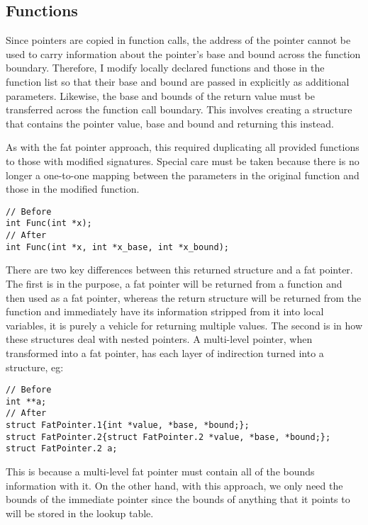 \subsection{Functions}

Since pointers are copied in function calls, the address of the pointer cannot be used to carry information about the pointer's base and bound across the function boundary.
Therefore, I modify locally declared functions and those in the function list so that their base and bound are passed in explicitly as additional parameters.
Likewise, the base and bounds of the return value must be transferred across the function call boundary.
This involves creating a structure that contains the pointer value, base and bound and returning this instead.

As with the fat pointer approach, this required duplicating all provided functions to those with modified signatures.
Special care must be taken because there is no longer a one-to-one mapping between the parameters in the original function and those in the modified function.

\begin{verbatim}
// Before
int Func(int *x);
// After
int Func(int *x, int *x_base, int *x_bound);
\end{verbatim}

There are two key differences between this returned structure and a fat pointer.
The first is in the purpose, a fat pointer will be returned from a function and then used as a fat pointer, whereas the return structure will be returned from the function and immediately have its information stripped from it into local variables, it is purely a vehicle for returning multiple values.
The second is in how these structures deal with nested pointers.
A multi-level pointer, when transformed into a fat pointer, has each layer of indirection turned into a structure, eg:

\begin{verbatim}
// Before
int **a;
// After
struct FatPointer.1{int *value, *base, *bound;};
struct FatPointer.2{struct FatPointer.2 *value, *base, *bound;};
struct FatPointer.2 a;
\end{verbatim}

This is because a multi-level fat pointer must contain all of the bounds information with it.
On the other hand, with this approach, we only need the bounds of the immediate pointer since the bounds of anything that it points to will be stored in the lookup table.

